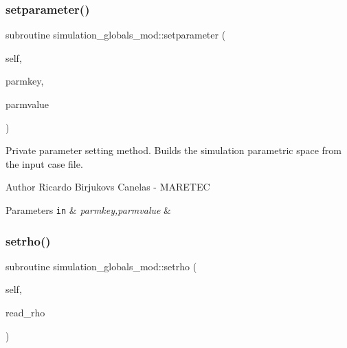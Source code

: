 \subsubsection{\texorpdfstring{setparameter()}{setparameter()}}
{\footnotesize\ttfamily subroutine simulation\+\_\+globals\+\_\+mod\+::setparameter (\begin{DoxyParamCaption}\item[{class(\hyperlink{structsimulation__globals__mod_1_1parameters__t}{parameters\+\_\+t}), intent(inout)}]{self,  }\item[{type(string), intent(in)}]{parmkey,  }\item[{type(string), intent(in)}]{parmvalue }\end{DoxyParamCaption})\hspace{0.3cm}{\ttfamily [private]}}



Private parameter setting method. Builds the simulation parametric space from the input case file. 

\begin{DoxyAuthor}{Author}
Ricardo Birjukovs Canelas -\/ M\+A\+R\+E\+T\+EC 
\end{DoxyAuthor}

\begin{DoxyParams}[1]{Parameters}
\mbox{\tt in}  & {\em parmkey,parmvalue} & \\
\hline
\end{DoxyParams}
\mbox{\label{namespacesimulation__globals__mod_a68a87c39cf88bad353e28e367a721ed4}} 
\subsubsection{\texorpdfstring{setrho()}{setrho()}}
{\footnotesize\ttfamily subroutine simulation\+\_\+globals\+\_\+mod\+::setrho (\begin{DoxyParamCaption}\item[{class(\hyperlink{structsimulation__globals__mod_1_1constants__t}{constants\+\_\+t}), intent(inout)}]{self,  }\item[{type(string), intent(in)}]{read\+\_\+rho }\end{DoxyParamCaption})\hspace{0.3cm}{\ttfamily [private]}}



